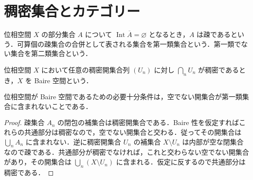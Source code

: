 \section{稠密集合とカテゴリー}
\begin{defn}[疎集合と第一類集合]
位相空間 $X$ の部分集合 $A$ について $\operatorname{Int}\overline A=\varnothing$ となるとき，$A$ は疎であるという．可算個の疎集合の合併として表される集合を第一類集合という．第一類でない集合を第二類集合という．
\end{defn}
\begin{defn}[Baire空間]
位相空間 $X$ において任意の稠密開集合列 $(U_n)$ に対し $\bigcap_n U_n$ が稠密であるとき，$X$ を Baire 空間という．
\end{defn}
\begin{prop}[Baire性のカテゴリーによる判定]
位相空間が Baire 空間であるための必要十分条件は，空でない開集合が第一類集合に含まれないことである．
\end{prop}
\begin{proof}
疎集合 $A_n$ の閉包の補集合は稠密開集合である．Baire 性を仮定すればこれらの共通部分は稠密なので，空でない開集合と交わる．従ってその開集合は $\bigcup_n A_n$ に含まれない．逆に稠密開集合 $U_n$ の補集合 $X\setminus U_n$ は内部が空な閉集合なので疎である．共通部分が稠密でなければ，これと交わらない空でない開集合があり，その開集合は $\bigcup_n(X\setminus U_n)$ に含まれる．仮定に反するので共通部分は稠密である．
\end{proof}
